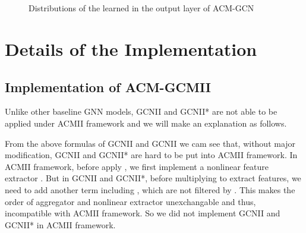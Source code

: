 \documentclass{article}
\newcommand{\0}{{\boldsymbol{0}}}
\newcommand{\6}{{\partial}}
\newcommand{\8}{{\infty}}
\newcommand{\4}{{\nabla}}
\begin{document}
\begin{figure}[H]
    \centering
     {
      \\
      \\
     }
     \caption{Distributions of the learned   in the output layer of ACM-GCN}
     \label{fig:Alpha_values_output_layer}
\end{figure}

\label{appendix:statistical_experimental_results}




\section{Details of the Implementation}
\label{appendix:details_implementation_acm_acmII}
\subsection{Implementation of ACM-GCMII}
Unlike other baseline GNN models, GCNII and GCNII* are not able to be applied under ACMII framework and we will make an explanation as follows.


From the above formulas of GCNII and GCNII we cam see that, without major modification, GCNII and GCNII* are hard to be put into ACMII framework. In ACMII framework, before apply , we first implement a nonlinear feature extractor . But in GCNII and GCNII*, before multiplying  to extract features, we need to add another term including , which are not filtered by . This makes the order of aggregator  and nonlinear extractor unexchangable and thus, incompatible with ACMII framework. So we did not implement GCNII and GCNII* in ACMII framework. 
\end{document}
